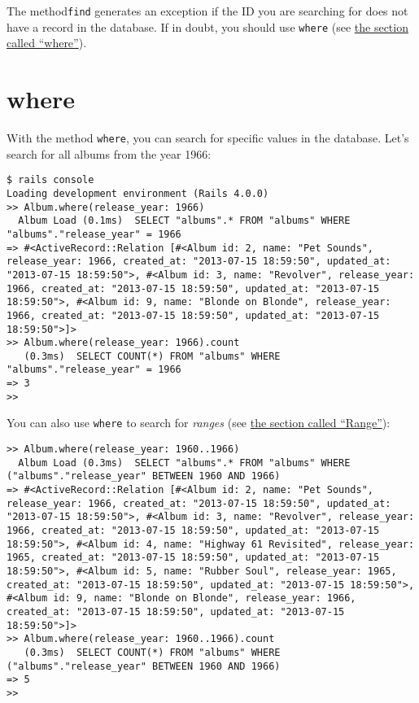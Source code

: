 \documentclass[a4paper]{book}
\newcounter{tab}[chapter]
\newcommand{\chap}[1]{\newpage\thispagestyle{empty}\chapter{#1}\label{chap:\thechapter}}
\begin{document}
The method\texttt{find} generates an exception if the ID you are searching for does not have a record in the database. If in doubt, you should use \texttt{where} (see \hyperref[activerecordux5fwhere]{the section called “where”}).

\chap{where}\label{where}

With the method \texttt{where}, you can search for specific values in the database. Let's search for all albums from the year 1966:

\begin{shaded}\begin{verbatim}
$ rails console
Loading development environment (Rails 4.0.0)
>> Album.where(release_year: 1966)
  Album Load (0.1ms)  SELECT "albums".* FROM "albums" WHERE "albums"."release_year" = 1966
=> #<ActiveRecord::Relation [#<Album id: 2, name: "Pet Sounds", release_year: 1966, created_at: "2013-07-15 18:59:50", updated_at: "2013-07-15 18:59:50">, #<Album id: 3, name: "Revolver", release_year: 1966, created_at: "2013-07-15 18:59:50", updated_at: "2013-07-15 18:59:50">, #<Album id: 9, name: "Blonde on Blonde", release_year: 1966, created_at: "2013-07-15 18:59:50", updated_at: "2013-07-15 18:59:50">]>
>> Album.where(release_year: 1966).count
   (0.3ms)  SELECT COUNT(*) FROM "albums" WHERE "albums"."release_year" = 1966
=> 3
>>
\end{verbatim}\end{shaded}

You can also use \texttt{where} to search for \emph{ranges} (see \hyperref[rangeux5fclass]{the section called “Range”}):

\begin{shaded}\begin{verbatim}
>> Album.where(release_year: 1960..1966)
  Album Load (0.3ms)  SELECT "albums".* FROM "albums" WHERE ("albums"."release_year" BETWEEN 1960 AND 1966)
=> #<ActiveRecord::Relation [#<Album id: 2, name: "Pet Sounds", release_year: 1966, created_at: "2013-07-15 18:59:50", updated_at: "2013-07-15 18:59:50">, #<Album id: 3, name: "Revolver", release_year: 1966, created_at: "2013-07-15 18:59:50", updated_at: "2013-07-15 18:59:50">, #<Album id: 4, name: "Highway 61 Revisited", release_year: 1965, created_at: "2013-07-15 18:59:50", updated_at: "2013-07-15 18:59:50">, #<Album id: 5, name: "Rubber Soul", release_year: 1965, created_at: "2013-07-15 18:59:50", updated_at: "2013-07-15 18:59:50">, #<Album id: 9, name: "Blonde on Blonde", release_year: 1966, created_at: "2013-07-15 18:59:50", updated_at: "2013-07-15 18:59:50">]>
>> Album.where(release_year: 1960..1966).count
   (0.3ms)  SELECT COUNT(*) FROM "albums" WHERE ("albums"."release_year" BETWEEN 1960 AND 1966)
=> 5
>>
\end{verbatim}\end{shaded}
\end{document}
